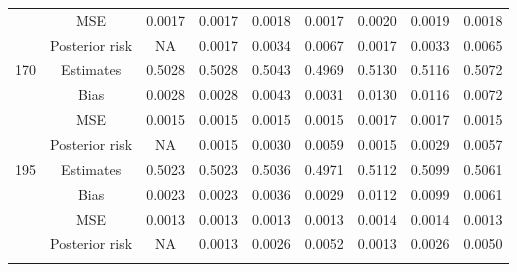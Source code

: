 \documentclass[a4paper,12pt]{report}
\begin{document}
\begin{minipage}{\linewidth}
{\begin{tabular}{|c|c|c|c|c|c|c|c|c|}
			&				MSE            &0.0017 &0.0017 &0.0018 &0.0017 &0.0020 &0.0019 &0.0018 \\
			&				Posterior risk   &NA &0.0017 &0.0034 &0.0067 &0.0017 &0.0033 &0.0065 \\ \hline
			170&			Estimates      &0.5028 &0.5028 &0.5043 &0.4969 &0.5130 &0.5116 &0.5072 \\
			&				Bias           &0.0028& 0.0028 &0.0043 &0.0031 &0.0130 &0.0116 &0.0072 \\
			&				MSE            &0.0015 &0.0015 &0.0015 &0.0015 &0.0017 &0.0017 &0.0015 \\
			&				Posterior risk   &NA &0.0015 &0.0030 &0.0059 &0.0015 &0.0029 &0.0057 \\ \hline
			195&				Estimates    &  0.5023 &0.5023 &0.5036 &0.4971 &0.5112 &0.5099 &0.5061 \\
			&				Bias           &0.0023 &0.0023 &0.0036 &0.0029 &0.0112 &0.0099 &0.0061 \\
			&				MSE            &0.0013 &0.0013 &0.0013 &0.0013 &0.0014 &0.0014 &0.0013 \\
			&				Posterior risk   &NA& 0.0013 &0.0026 &0.0052 &0.0013 &0.0026 &0.0050 \\ \hline
			\ECC
		\end{tabular}
	}
\end{minipage}

\newpage
\end{document}
